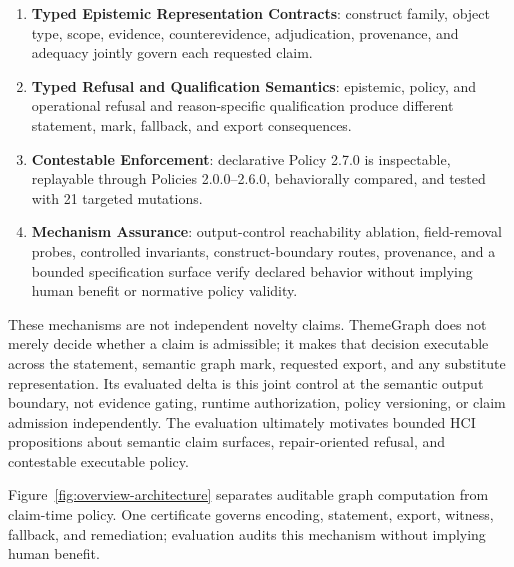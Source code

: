 \documentclass[manuscript,screen,review,anonymous]{acmart}
\begin{document}
\begin{enumerate}
  \item \textbf{Typed Epistemic Representation Contracts}: construct family, object type, scope, evidence, counterevidence, adjudication, provenance, and adequacy jointly govern each requested claim.
  \item \textbf{Typed Refusal and Qualification Semantics}: epistemic, policy, and operational refusal and reason-specific qualification produce different statement, mark, fallback, and export consequences.
  \item \textbf{Contestable Enforcement}: declarative Policy 2.7.0 is inspectable, replayable through Policies 2.0.0--2.6.0, behaviorally compared, and tested with 21 targeted mutations.
  \item \textbf{Mechanism Assurance}: output-control reachability ablation, field-removal probes, controlled invariants, construct-boundary routes, provenance, and a bounded specification surface verify declared behavior without implying human benefit or normative policy validity.
\end{enumerate}

These mechanisms are not independent novelty claims. ThemeGraph does not merely decide whether a claim is admissible; it makes that decision executable across the statement, semantic graph mark, requested export, and any substitute representation. Its evaluated delta is this joint control at the semantic output boundary, not evidence gating, runtime authorization, policy versioning, or claim admission independently. The evaluation ultimately motivates bounded HCI propositions about semantic claim surfaces, repair-oriented refusal, and contestable executable policy.

Figure~\ref{fig:overview-architecture} separates auditable graph computation from claim-time policy. One certificate governs encoding, statement, export, witness, fallback, and remediation; evaluation audits this mechanism without implying human benefit.
\end{document}

